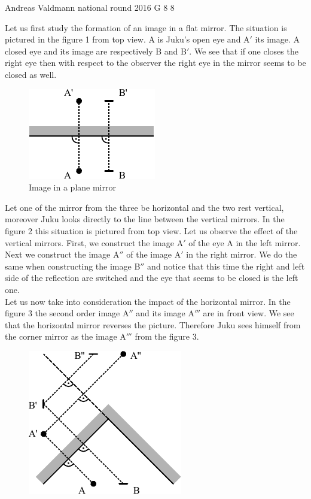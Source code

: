 \documentclass[11pt]{article}
\begin{document}
{Andreas Valdmann} %
{national round} %
{2016} %
{G 8} %
{8} %
{

\ifEngSolution
Let us first study the formation of an image in a flat mirror. The situation is pictured in the figure 1 from top view. A is Juku’s open eye and A$'$ its image. A closed eye and its image are respectively B and B$'$. We see that if one closes the right eye then with respect to the observer the right eye in the mirror seems to be closed as well. 
\begin{figure}[h]
	\centerline{\includegraphics[scale=1.2]{2016-v3g-08-nurgapeegel_j1}}
	\caption{Image in a plane mirror}
\end{figure}
Let one of the mirror from the three be horizontal and the two rest vertical, moreover Juku looks directly to the line between the vertical mirrors. In the figure 2 this situation is pictured from top view. Let us observe the effect of the vertical mirrors. First, we construct the image A$'$ of the eye A in the left mirror. Next we construct the image A$''$ of the image A$'$ in the right mirror. We do the same when constructing the image B$''$ and notice that this time the right and left side of the reflection are switched and the eye that seems to be closed is the left one.\\
Let us now take into consideration the impact of the horizontal mirror. In the figure 3 the second order image A$''$ and its image A$'''$ are in front view. We see that the horizontal mirror reverses the picture. Therefore Juku sees himself from the corner mirror as the image A$'''$ from the figure 3. 
\begin{figure}[h]
	\centerline{\includegraphics[scale=1.2]{2016-v3g-08-nurgapeegel_j2}}

\end{figure}}
\end{document}
